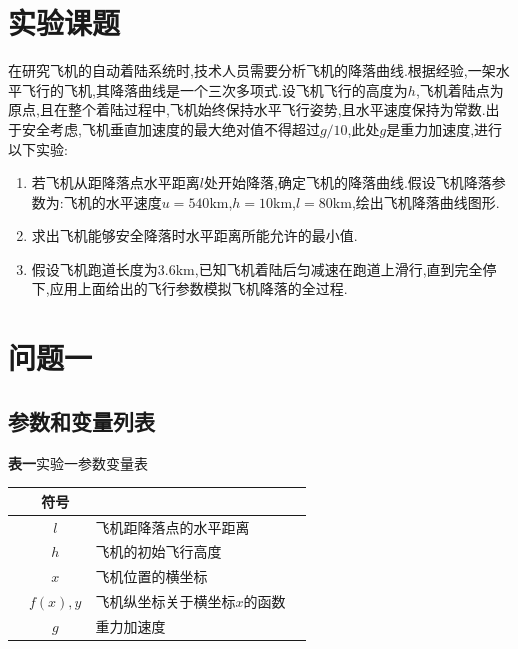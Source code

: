 \documentclass[a4paper,12pt]{article}
\begin{document}
\begin{CJK*}{UTF8}{gbsn}



\section{实验课题}
在研究飞机的自动着陆系统时,技术人员需要分析飞机的降落曲线.根据经验,一架水平飞行的飞机,其降落曲线是一个三次多项式.设飞机飞行的高度为$h$,飞机着陆点为原点,且在整个着陆过程中,飞机始终保持水平飞行姿势,且水平速度保持为常数.出于安全考虑,飞机垂直加速度的最大绝对值不得超过$g/10$,此处$g$是重力加速度,进行以下实验:\par 
\begin{enumerate}
\item 若飞机从距降落点水平距离$l$处开始降落,确定飞机的降落曲线.假设飞机降落参数为:飞机的水平速度$u=540$km,$h=10$km,$l=80$km,绘出飞机降落曲线图形.
\item 求出飞机能够安全降落时水平距离所能允许的最小值.
\item 假设飞机跑道长度为$3.6$km,已知飞机着陆后匀减速在跑道上滑行,直到完全停下,应用上面给出的飞行参数模拟飞机降落的全过程.
\end{enumerate}



\section{问题一}


\subsection{参数和变量列表}
\begin{center}
\textbf{表一}\quad 实验一参数变量表\\\vspace{2pt}
\begin{tabular}{cclc}
\toprule[1.5pt]
& 符号 & \qquad\qquad{} &\\
\midrule[1.5pt]
& $l$ & 飞机距降落点的水平距离 &\\
& $h$ & 飞机的初始飞行高度 &\\
& $x$ & 飞机位置的横坐标 &\\
& $f(x),y$ & 飞机纵坐标关于横坐标$x$的函数 &\\
& $g$ & 重力加速度 &\\
\bottomrule[1.5pt]
\end{tabular}
\end{center}



\end{CJK*}
\end{document}
